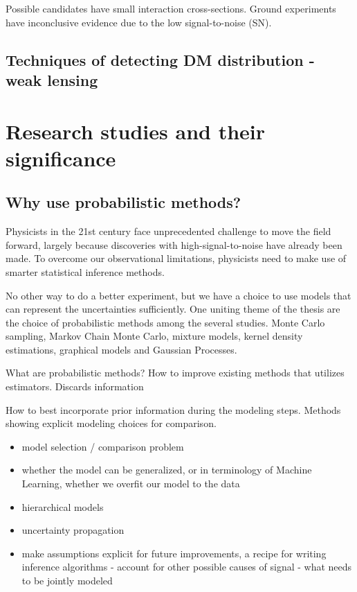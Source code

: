 \documentclass[ucdthesis.tex]{subfiles}
\begin{document}
		Possible candidates have small interaction cross-sections. 
		Ground  experiments have inconclusive evidence due to the low
		signal-to-noise (SN).

		\subsection{Techniques of detecting DM distribution - weak lensing}

		\section{Research studies and their significance}
		\subsection{Why use probabilistic methods?}
		Physicists in the 21st century face unprecedented challenge to move the
		field forward, largely because discoveries with high-signal-to-noise have
		already been made.   
		To overcome our observational limitations, physicists need to make use of
		smarter statistical inference methods.


		No other way to do a better experiment, but we have a choice to use models
		that can represent the uncertainties sufficiently.
		One uniting theme of the thesis are the choice of probabilistic methods
		among the several studies. Monte Carlo sampling, Markov Chain Monte Carlo, 
		mixture models, kernel density estimations, graphical models and 
		Gaussian Processes. 

		What are probabilistic methods?
		How to improve existing methods that utilizes estimators. 
		Discards information 

		How to best incorporate prior information during the modeling steps. 
		Methods showing explicit modeling choices for comparison. 
		
		\begin{itemize}
		\item model selection / comparison problem
		\item whether the model can be generalized, or in terminology of Machine
			Learning, whether we overfit our model to the data 
		\item hierarchical models 
		\item uncertainty propagation 
		\item make assumptions explicit for future improvements, a recipe for writing
		inference algorithms - account for other possible causes of signal 
		- what needs to be jointly modeled 
		\end{itemize}
\end{document}
